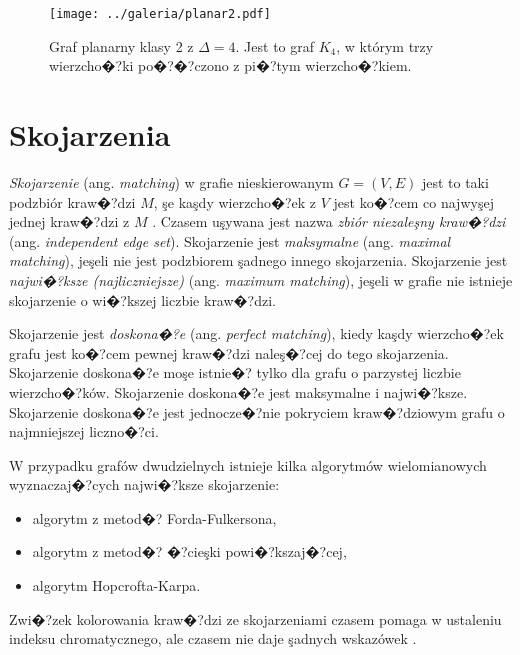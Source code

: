 \documentclass[12pt,a4paper]{mwrep}
\begin{document}
\begin{figure}[h]
\centering
\texttt{[image: ../galeria/planar2.pdf]}
\caption[Graf planarny klasy 2 z $\Delta=4$.]{
\label{fig:planar2}
Graf planarny klasy 2 z $\Delta=4$.
Jest to graf $K_4$, w którym trzy wierzcho�?ki po�?�?czono
z pi�?tym wierzcho�?kiem.}
\end{figure}




\section{Skojarzenia}
\label{sec:matching}

\emph{Skojarzenie} (ang. \emph{matching}) w grafie nieskierowanym
$G=(V,E)$ jest to taki podzbiór kraw�?dzi $M$, şe kaşdy wierzcho�?ek
z $V$ jest ko�?cem co najwyşej jednej kraw�?dzi z $M$
\cite{wiki_matching}.
Czasem uşywana jest nazwa \emph{zbiór niezaleşny kraw�?dzi}
(ang. \emph{independent edge set}).
Skojarzenie jest \emph{maksymalne} (ang. \emph{maximal matching}),
jeşeli nie jest podzbiorem şadnego innego skojarzenia.
Skojarzenie jest \emph{najwi�?ksze (najliczniejsze)} 
(ang. \emph{maximum matching}),
jeşeli w grafie nie istnieje skojarzenie o wi�?kszej liczbie kraw�?dzi.

Skojarzenie jest \emph{doskona�?e} (ang. \emph{perfect matching}),
kiedy kaşdy wierzcho�?ek grafu jest ko�?cem pewnej kraw�?dzi
naleş�?cej do tego skojarzenia. Skojarzenie doskona�?e moşe
istnie�? tylko dla grafu o parzystej liczbie wierzcho�?ków.
Skojarzenie doskona�?e jest maksymalne i najwi�?ksze.
Skojarzenie doskona�?e jest jednocze�?nie pokryciem kraw�?dziowym
grafu o najmniejszej liczno�?ci.


W przypadku grafów dwudzielnych \cite{wiki_bipartite_graph}
istnieje kilka algorytmów
wielomianowych wyznaczaj�?cych najwi�?ksze skojarzenie:

\begin{itemize}
\item algorytm z metod�? Forda-Fulkersona,
\item algorytm z metod�? �?cieşki powi�?kszaj�?cej,
\item algorytm Hopcrofta-Karpa.
\end{itemize}

Zwi�?zek kolorowania kraw�?dzi ze skojarzeniami czasem pomaga
w ustaleniu indeksu chromatycznego, ale czasem nie daje şadnych wskazówek
\cite{wiki_edge_coloring}.
\end{document}
